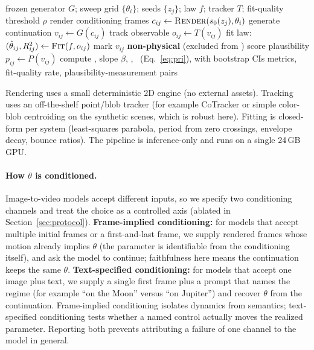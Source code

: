\documentclass[10pt,twocolumn,letterpaper]{article}
\begin{document}
\begin{algorithm}[H]
\caption{\textsc{PhysWeep} measurement for one system and one model}
\label{alg:pipeline}
\begin{algorithmic}[1]
\Require frozen generator $G$; sweep grid $\{\theta_i\}$; seeds $\{z_j\}$;
         law $f$; tracker $T$; fit-quality threshold $\rho$
  \State render conditioning frames $c_{ij}\gets \textsc{Render}(s_0(z_j),\theta_i)$
  \State generate continuation $v_{ij}\gets G(c_{ij})$
  \State track observable $o_{ij}\gets T(v_{ij})$
  \State fit law: $(\hat{\theta}_{ij}, R^2_{ij})\gets \textsc{Fit}(f, o_{ij})$
   \State mark $v_{ij}$ \textbf{non-physical} (excluded from \PRE) \EndIf
  \State score plausibility $p_{ij}\gets P(v_{ij})$ 
\EndFor
\State compute \PRE, slope $\beta$, \EG, \PRI\ (Eq.~\ref{eq:pri}), with bootstrap CIs
\State \Return metrics, fit-quality rate, plausibility-measurement pairs
\end{algorithmic}
\end{algorithm}

Rendering uses a small deterministic 2D engine (no external assets). Tracking
uses an off-the-shelf point/blob tracker (for example CoTracker
\citep{karaev2023cotracker} or simple color-blob centroiding on the synthetic
scenes, which is robust here). Fitting is closed-form per system
(least-squares parabola, period from zero crossings, envelope decay, bounce
ratios). The pipeline is inference-only and runs on a single 24\,GB GPU.

\paragraph{How $\theta$ is conditioned.}
Image-to-video models accept different inputs, so we specify two conditioning
channels and treat the choice as a controlled axis (ablated in
Section~\ref{sec:protocol}). \textbf{Frame-implied conditioning:} for models that accept
multiple initial frames or a first-and-last frame, we supply rendered frames
whose motion already implies $\theta$ (the parameter is identifiable from the
conditioning itself), and ask the model to continue; faithfulness here means the
continuation keeps the same $\theta$. \textbf{Text-specified conditioning:} for models
that accept one image plus text, we supply a single first frame plus a prompt
that names the regime (for example ``on the Moon'' versus ``on Jupiter'') and
recover $\theta$ from the continuation. Frame-implied conditioning isolates dynamics from semantics; text-specified conditioning
tests whether a named control actually moves the realized parameter. Reporting
both prevents attributing a failure of one channel to the model in general.
\end{document}
